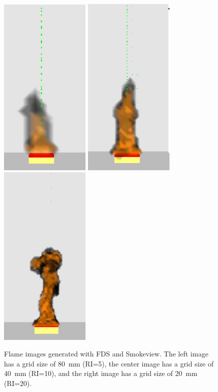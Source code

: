 \documentclass[twoside]{uocthesis}
\begin{document}
{\begin{figure}[ht!]
  \centering
  \includegraphics[width=1.7in]{../Figures/NG_80kW_GBWall_2D_RI=05_0601crop}
  \includegraphics[width=1.7in]{../Figures/NG_80kW_GBWall_2D_RI=10_0601crop}
  \includegraphics[width=1.7in]{../Figures/NG_80kW_GBWall_2D_RI=20_0601crop}\\
  \caption[Flame images generated with FDS and Smokeview]{Flame images generated with FDS and Smokeview. The left image has a grid size of 80~mm (RI=5), the center image has a grid size of 40~mm (RI=10), and the right image has a grid size of 20~mm (RI=20).}
  \label{FDS_Flame_Image_comp}
\end{figure}

}
\end{document}
